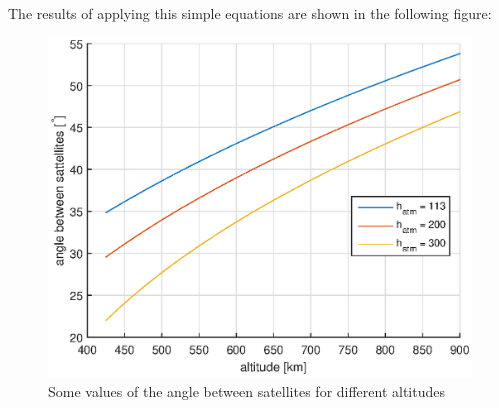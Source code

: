 \paragraph{}The results of applying this simple equations are shown in the following figure:
\begin{figure}[H]
\centering
\includegraphics[scale=0.8]{./sections/3_Constellation/img/grafic.eps}
\caption{Some values of the angle between satellites for different altitudes}
\end{figure}


